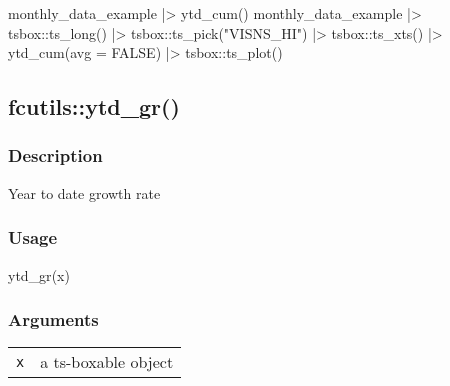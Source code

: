 \documentclass[
  letterpaper,
  DIV=11,
  numbers=noendperiod]{scrreport}
\newenvironment{Shaded}{\begin{snugshade}}{\end{snugshade}}
\newcommand{\AttributeTok}[1]{\textcolor[rgb]{0.40,0.45,0.13}{#1}}
\newcommand{\ConstantTok}[1]{\textcolor[rgb]{0.56,0.35,0.01}{#1}}
\newcommand{\FunctionTok}[1]{\textcolor[rgb]{0.28,0.35,0.67}{#1}}
\newcommand{\NormalTok}[1]{\textcolor[rgb]{0.00,0.23,0.31}{#1}}
\newcommand{\SpecialCharTok}[1]{\textcolor[rgb]{0.37,0.37,0.37}{#1}}
\newcommand{\StringTok}[1]{\textcolor[rgb]{0.13,0.47,0.30}{#1}}
\begin{document}
\begin{Shaded}
\begin{Highlighting}[]
\NormalTok{monthly\_data\_example }\SpecialCharTok{|\textgreater{}}
  \FunctionTok{ytd\_cum}\NormalTok{()}
\NormalTok{monthly\_data\_example }\SpecialCharTok{|\textgreater{}}
\NormalTok{  tsbox}\SpecialCharTok{::}\FunctionTok{ts\_long}\NormalTok{() }\SpecialCharTok{|\textgreater{}}
\NormalTok{  tsbox}\SpecialCharTok{::}\FunctionTok{ts\_pick}\NormalTok{(}\StringTok{"VISNS\_HI"}\NormalTok{) }\SpecialCharTok{|\textgreater{}}
\NormalTok{  tsbox}\SpecialCharTok{::}\FunctionTok{ts\_xts}\NormalTok{() }\SpecialCharTok{|\textgreater{}}
  \FunctionTok{ytd\_cum}\NormalTok{(}\AttributeTok{avg =} \ConstantTok{FALSE}\NormalTok{) }\SpecialCharTok{|\textgreater{}}
\NormalTok{  tsbox}\SpecialCharTok{::}\FunctionTok{ts\_plot}\NormalTok{()}
\end{Highlighting}
\end{Shaded}

\subsection{fcutils::ytd\_gr()}\label{fcutilsytd_gr}

\subsubsection{Description}\label{description-42}

Year to date growth rate

\subsubsection{Usage}\label{usage-42}

\begin{Shaded}
\begin{Highlighting}[]
\FunctionTok{ytd\_gr}\NormalTok{(x)}
\end{Highlighting}
\end{Shaded}

\subsubsection{Arguments}\label{arguments-42}

\begin{longtable}[]{@{}ll@{}}
\toprule\noalign{}
\endhead
\bottomrule\noalign{}
\endlastfoot
\texttt{x} & a ts-boxable object \\
\end{longtable}
\end{document}
